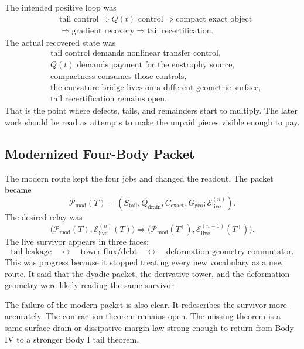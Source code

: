 The intended positive loop was
\[
  \begin{aligned}
  &\text{tail control}
  \Longrightarrow Q(t)\text{ control}
  \Longrightarrow \text{compact exact object}\\
  &\Longrightarrow
  \text{gradient recovery}
  \Longrightarrow
  \text{tail recertification}.
  \end{aligned}
\]
The actual recovered state was
\[
  \begin{aligned}
  &\text{tail control demands nonlinear transfer control},\\
  &Q(t)\text{ demands payment for the enstrophy source},\\
  &\text{compactness consumes those controls},\\
  &\text{the curvature bridge lives on a different geometric surface},\\
  &\text{tail recertification remains open}.
  \end{aligned}
\]
That is the point where defects, tails, and remainders start to multiply.
The later work should be read as attempts to make the unpaid pieces visible
enough to pay.

\subsection{Modernized Four-Body Packet}

The modern route kept the four jobs and changed the readout.
The packet became
\[
  \mathcal P_{\mathrm{mod}}(T)
  =
  (S_{\mathrm{tail}},Q_{\mathrm{drain}},C_{\mathrm{exact}},G_{\mathrm{geo}};
  \mathcal E_{\mathrm{live}}^{(n)}).
\]
The desired relay was
\[
  \bigl(\mathcal P_{\mathrm{mod}}(T),
  \mathcal E_{\mathrm{live}}^{(n)}(T)\bigr)
  \Longrightarrow
  \bigl(\mathcal P_{\mathrm{mod}}(T^+),
  \mathcal E_{\mathrm{live}}^{(n+1)}(T^+)\bigr).
\]
The live survivor appears in three faces:
\[
  \text{tail leakage}
  \quad\leftrightarrow\quad
  \text{tower flux/debt}
  \quad\leftrightarrow\quad
  \text{deformation-geometry commutator}.
\]
This was progress because it stopped treating every new vocabulary as a new
route.
It said that the dyadic packet, the derivative tower, and the deformation
geometry were likely reading the same survivor.

The failure of the modern packet is also clear.
It redescribes the survivor more accurately.
The contraction theorem remains open.
The missing theorem is a same-surface drain or dissipative-margin law strong enough to
return from Body IV to a stronger Body I tail theorem.

